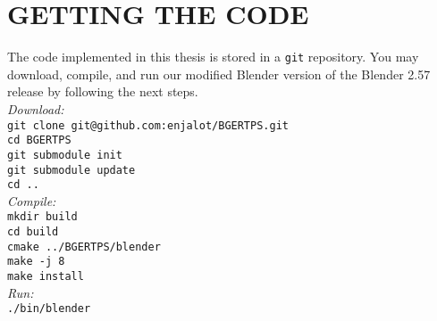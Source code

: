 \chapter{GETTING THE CODE}

The code implemented in this thesis is stored in a \texttt{git} repository. You may download, compile, and run our modified Blender version of the Blender 2.57 release by following the next steps. \\

\noindent
\textit{Download:} \\
\texttt{git clone git@github.com:enjalot/BGERTPS.git} \\
\texttt{cd BGERTPS} \\
\texttt{git submodule init} \\
\texttt{git submodule update} \\
\texttt{cd ..} \\

\noindent
\textit{Compile:} \\
\texttt{mkdir build} \\
\texttt{cd build} \\
\texttt{cmake ../BGERTPS/blender} \\
\texttt{make -j 8} \\
\texttt{make install} \\

\noindent
\textit{Run:} \\
\texttt{./bin/blender} \\


